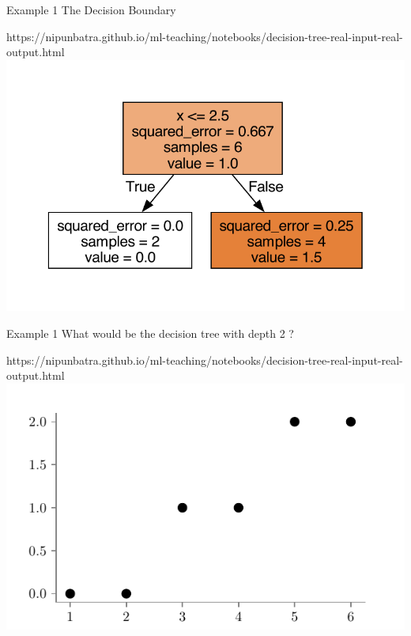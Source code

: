 \documentclass[usenames,dvipsnames]{beamer}
\begin{document}
\begin{frame}{Example 1}
The Decision Boundary
\begin{center}
	\begin{notebookbox}{https://nipunbatra.github.io/ml-teaching/notebooks/decision-tree-real-input-real-output.html}
		\includegraphics[scale=0.6]{../assets/decision-trees/figures/ri-ro-depth-1-sklearn.pdf}
	\end{notebookbox}
\end{center}
\end{frame}


\begin{frame}{Example 1}
What would be the decision tree with depth 2	?
\begin{center}
	\begin{notebookbox}{https://nipunbatra.github.io/ml-teaching/notebooks/decision-tree-real-input-real-output.html}
		\includegraphics{../assets/decision-trees/figures/ri-ro-dataset.pdf}
	  \end{notebookbox}
\end{center}
\end{frame}
\end{document}
